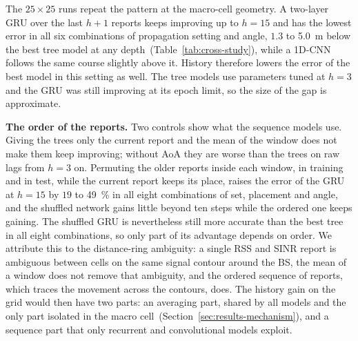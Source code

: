 The $25\times25$ runs repeat the pattern at the macro-cell geometry. A two-layer GRU over the last $h+1$ reports keeps improving up to $h=15$ and has the lowest error in all six combinations of propagation setting and angle, $1.3$ to \SI{5.0}{\meter} below the best tree model at any depth~(Table~\ref{tab:cross-study}), while a 1D-CNN follows the same course slightly above it. History therefore lowers the error of the best model in this setting as well. The tree models use parameters tuned at $h=3$ and the GRU was still improving at its epoch limit, so the size of the gap is approximate.

\noindent\textbf{The order of the reports.} Two controls show what the sequence models use. Giving the trees only the current report and the mean of the window does not make them keep improving; without AoA they are worse than the trees on raw lags from $h=3$ on. Permuting the older reports inside each window, in training and in test, while the current report keeps its place, raises the error of the GRU at $h=15$ by $19$ to \SI{49}{\percent} in all eight combinations of set, placement and angle, and the shuffled network gains little beyond ten steps while the ordered one keeps gaining. The shuffled GRU is nevertheless still more accurate than the best tree in all eight combinations, so only part of its advantage depends on order. We attribute this to the distance-ring ambiguity: a single RSS and SINR report is ambiguous between cells on the same signal contour around the BS, the mean of a window does not remove that ambiguity, and the ordered sequence of reports, which traces the movement across the contours, does. The history gain on the grid would then have two parts: an averaging part, shared by all models and the only part isolated in the macro cell~(Section~\ref{sec:results-mechanism}), and a sequence part that only recurrent and convolutional models exploit.

